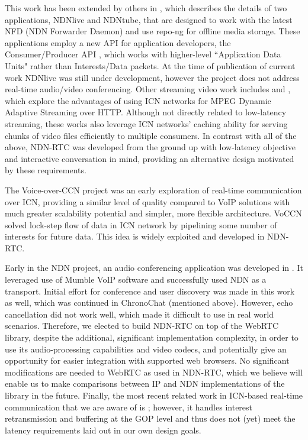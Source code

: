 \documentclass{icn/sig-alternate-2013} %
\newcommand{\ndnrtcName}{NDN-RTC} %
\begin{document}
This work has been extended by others in \cite{ndnlive-tube}, which describes the details of two applications, NDNlive and NDNtube, that are designed to work with the latest NFD (NDN Forwarder Daemon) and use repo-ng \cite{repo-ng} for offline media storage. These applications employ a new API for application developers, the Consumer/Producer API \cite{cons-prod-api}, which works with higher-level ``Application Data Units" rather than Interests/Data packets. 
At the time of publication of current work NDNlive was still under development, however the  project does not address real-time audio/video conferencing.  
Other streaming video work includes \cite{ccn-dash} and \cite{ndn-dash}, which explore the advantages of using ICN networks for MPEG Dynamic Adaptive Streaming over HTTP. Although not directly related to low-latency streaming, these works also leverage ICN networks' caching ability for serving chunks of video files efficiently to multiple consumers.
In contrast with all of the above, \ndnrtcName{} was developed from the ground up with low-latency objective and interactive conversation in mind, providing an alternative design motivated by these requirements. %

The Voice-over-CCN project \cite{voccn} was an early exploration of real-time communication over ICN, providing a similar level of quality compared to VoIP solutions with much greater scalability potential and simpler, more flexible architecture. VoCCN solved lock-step flow of data in ICN network by pipelining some number of interests for future data. This idea is widely exploited and developed in \ndnrtcName{}.

Early in the NDN project, an audio conferencing application was developed in \cite{act-tool}. It leveraged use of Mumble VoIP software and successfully used NDN as a transport.  Initial effort for conference and user discovery was made in this work as well, which was continued in ChronoChat (mentioned above).  However, echo cancellation did not work well, which made it difficult to use in real world scenarios. Therefore, we elected to build \ndnrtcName{} on top of the WebRTC library, despite the additional, significant implementation complexity, in order to use its audio-processing capabilities and video codecs, and potentially give an opportunity for easier integration with supported web browsers.  No significant modifications are needed to WebRTC as used in \ndnrtcName{}, which we believe will enable us to make comparisons between IP and NDN implementations of the library in the future.  Finally, the most recent related work in ICN-based real-time communication that we are aware of is \cite{huawei-rtc}; however, it handles interest retransmission and buffering at the GOP level and thus does not (yet) meet the latency requirements laid out in our own design goals. 
\end{document}
